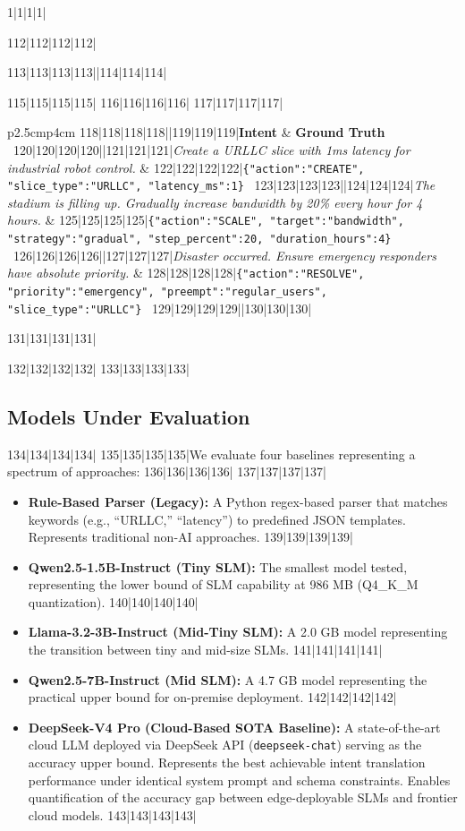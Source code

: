 1|1|1|1|\documentclass[10pt,conference]{IEEEtran}
\begin{document}
112|112|112|112|\begin{table}[h]
113|113|113|113||114|114|114|\caption{Representative Intent Examples with Ground Truth}
115|115|115|115|\label{tab:samples}
116|116|116|116|\footnotesize
117|117|117|117|\begin{tabular}{p{2.5cm}p{4cm}}
118|118|118|118||119|119|119|\textbf{Intent} & \textbf{Ground Truth} \
120|120|120|120||121|121|121|\textit{Create a URLLC slice with 1ms latency for industrial robot control.} & 
122|122|122|122|\scriptsize{\texttt{\{"action":"CREATE", "slice\_type":"URLLC", "latency\_ms":1\}}} \
123|123|123|123|\midrule
124|124|124|124|\textit{The stadium is filling up. Gradually increase bandwidth by 20\% every hour for 4 hours.} & 
125|125|125|125|\scriptsize{\texttt{\{"action":"SCALE", "target":"bandwidth", "strategy":"gradual", "step\_percent":20, "duration\_hours":4\}}} \
126|126|126|126|\midrule
127|127|127|127|\textit{Disaster occurred. Ensure emergency responders have absolute priority.} &
128|128|128|128|\scriptsize{\texttt{\{"action":"RESOLVE", "priority":"emergency", "preempt":"regular\_users", "slice\_type":"URLLC"\}}} \
129|129|129|129|\bottomrule
130|130|130|130|\end{tabular}
131|131|131|131|\end{table}
132|132|132|132|
133|133|133|133|\subsection{Models Under Evaluation}
134|134|134|134|
135|135|135|135|We evaluate four baselines representing a spectrum of approaches:
136|136|136|136|
137|137|137|137|\begin{itemize}
138|138|138|138|    \item \textbf{Rule-Based Parser (Legacy):} A Python regex-based parser that matches keywords (e.g., ``URLLC,'' ``latency'') to predefined JSON templates. Represents traditional non-AI approaches.
139|139|139|139|    \item \textbf{Qwen2.5-1.5B-Instruct (Tiny SLM):} The smallest model tested, representing the lower bound of SLM capability at 986 MB (Q4\_K\_M quantization).
140|140|140|140|    \item \textbf{Llama-3.2-3B-Instruct (Mid-Tiny SLM):} A 2.0 GB model representing the transition between tiny and mid-size SLMs.
141|141|141|141|    \item \textbf{Qwen2.5-7B-Instruct (Mid SLM):} A 4.7 GB model representing the practical upper bound for on-premise deployment.
142|142|142|142|    \item \textbf{DeepSeek-V4 Pro (Cloud-Based SOTA Baseline):} A state-of-the-art cloud LLM deployed via DeepSeek API (\texttt{deepseek-chat}) serving as the accuracy upper bound. Represents the best achievable intent translation performance under identical system prompt and schema constraints. Enables quantification of the accuracy gap between edge-deployable SLMs and frontier cloud models.
143|143|143|143|\end{itemize}
\end{document}
